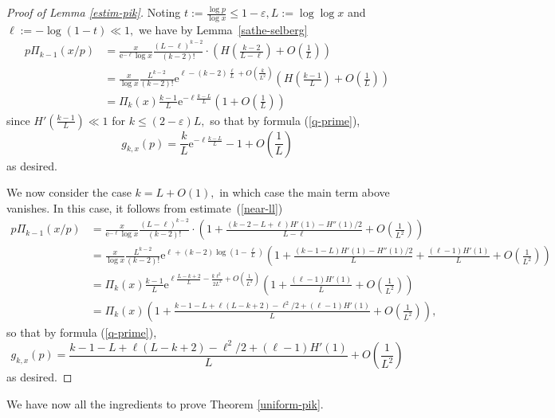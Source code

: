 \documentclass{article}
\newcommand{\e}{\mathrm{e}}
\newcommand{\eps}{\varepsilon}
\begin{document}
\begin{proof}[Proof of Lemma \ref{estim-pik}]
    Noting $t := \frac{\log p}{\log x} \le 1 - \eps, L := \log\log x$ and $\ell := -\log(1-t) \ll 1,$ we have by Lemma~\ref{sathe-selberg}
    \begin{align*}
        p\Pi_{k-1}(x/p) &= \frac{x}{\e^{-\ell} \log x} \frac{(L-\ell)^{k-2}}{(k-2)!} \cdot\left(H\left(\frac{k-2}{L-\ell}\right) + O\left(\frac{1}{L}\right)\right)
        \\&= \frac{x}{\log x} \frac{L^{k-2}}{(k-2)!} \e^{\ell - (k-2)\frac{\ell}{L} + O\left(\frac{k}{L^2}\right)} \left(H\left(\frac{k-1}{L}\right) + O\left(\frac{1}{L}\right)\right)
        \\&= \Pi_k(x) \frac{k-1}{L} \e^{-\ell \frac{k-L}{L}} \left(1 + O\left(\frac{1}{L}\right)\right)
    \end{align*}
    since $H'\left(\frac{k-1}{L}\right) \ll 1$ for $k \le (2-\eps)L,$
    so that by formula (\ref{q-prime}), $$g_{k,x}(p) = \frac{k}{L} \e^{-\ell \frac{k-L}{L}} - 1 + O\left(\frac{1}{L}\right)$$ as desired. 

    We now consider the case $k = L + O(1),$ in which case the main term above vanishes. In this case, it follows from estimate~(\ref{near-ll})
    \begin{align*}
        p\Pi_{k-1}(x/p) &= \frac{x}{\e^{-\ell} \log x} \frac{(L-\ell)^{k-2}}{(k-2)!} \cdot\left(1 + \frac{(k-2 - L + \ell) H'(1) - H''(1)/2}{L - \ell} + O\left(\frac{1}{L^2}\right)\right)
        \\&= \frac{x}{\log x} \frac{L^{k-2}}{(k-2)!} \e^{\ell + (k-2)\log\left(1-\frac{\ell}{L}\right)} \left(1 + \frac{(k-1 - L) H'(1) - H''(1)/2}{L} + \frac{(\ell-1) H'(1)}{L} + O\left(\frac{1}{L^2}\right)\right)
        \\&= \Pi_k(x) \frac{k-1}{L} \e^{\ell \frac{L-k+2}{L} - \frac{k\ell^2}{2L^2} + O\left(\frac{1}{L^2}\right)} \left(1 + \frac{(\ell-1) H'(1)}{L} + O\left(\frac{1}{L^2}\right)\right)
        \\&= \Pi_k(x) \left(1 + \frac{k-1-L + \ell(L-k+2) - \ell^2/2 + (\ell-1) H'(1)}{L} + O\left(\frac{1}{L^2}\right)\right),
    \end{align*}
    so that by formula (\ref{q-prime}), $$g_{k,x}(p) = \frac{k-1-L + \ell(L-k+2) - \ell^2/2 + (\ell-1) H'(1)}{L} + O\left(\frac{1}{L^2}\right)$$ as desired. 
\end{proof}

We have now all the ingredients to prove Theorem \ref{uniform-pik}.
\end{document}
